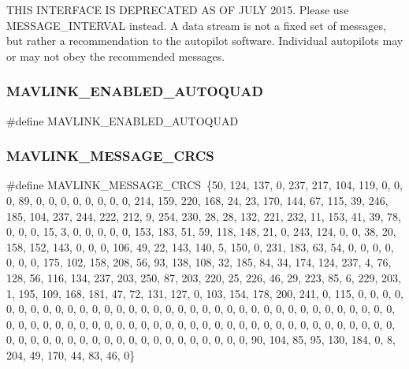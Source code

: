 T\+H\+IS I\+N\+T\+E\+R\+F\+A\+CE IS D\+E\+P\+R\+E\+C\+A\+T\+ED AS OF J\+U\+LY 2015. Please use M\+E\+S\+S\+A\+G\+E\+\_\+\+I\+N\+T\+E\+R\+V\+AL instead. A data stream is not a fixed set of messages, but rather a recommendation to the autopilot software. Individual autopilots may or may not obey the recommended messages. 

\mbox{\label{autoquad_8h_ac0d3655d20affab85c2c0160761e4fac}} 
\subsubsection{M\+A\+V\+L\+I\+N\+K\+\_\+\+E\+N\+A\+B\+L\+E\+D\+\_\+\+A\+U\+T\+O\+Q\+U\+AD}
{\footnotesize\ttfamily \#define M\+A\+V\+L\+I\+N\+K\+\_\+\+E\+N\+A\+B\+L\+E\+D\+\_\+\+A\+U\+T\+O\+Q\+U\+AD}

\mbox{\label{autoquad_8h_a3f709d5835acb54a11202a5fdc7a6bfe}} 
\subsubsection{M\+A\+V\+L\+I\+N\+K\+\_\+\+M\+E\+S\+S\+A\+G\+E\+\_\+\+C\+R\+CS}
{\footnotesize\ttfamily \#define M\+A\+V\+L\+I\+N\+K\+\_\+\+M\+E\+S\+S\+A\+G\+E\+\_\+\+C\+R\+CS~\{50, 124, 137, 0, 237, 217, 104, 119, 0, 0, 0, 89, 0, 0, 0, 0, 0, 0, 0, 0, 214, 159, 220, 168, 24, 23, 170, 144, 67, 115, 39, 246, 185, 104, 237, 244, 222, 212, 9, 254, 230, 28, 28, 132, 221, 232, 11, 153, 41, 39, 78, 0, 0, 0, 15, 3, 0, 0, 0, 0, 0, 153, 183, 51, 59, 118, 148, 21, 0, 243, 124, 0, 0, 38, 20, 158, 152, 143, 0, 0, 0, 106, 49, 22, 143, 140, 5, 150, 0, 231, 183, 63, 54, 0, 0, 0, 0, 0, 0, 0, 175, 102, 158, 208, 56, 93, 138, 108, 32, 185, 84, 34, 174, 124, 237, 4, 76, 128, 56, 116, 134, 237, 203, 250, 87, 203, 220, 25, 226, 46, 29, 223, 85, 6, 229, 203, 1, 195, 109, 168, 181, 47, 72, 131, 127, 0, 103, 154, 178, 200, 241, 0, 115, 0, 0, 0, 0, 0, 0, 0, 0, 0, 0, 0, 0, 0, 0, 0, 0, 0, 0, 0, 0, 0, 0, 0, 0, 0, 0, 0, 0, 0, 0, 0, 0, 0, 0, 0, 0, 0, 0, 0, 0, 0, 0, 0, 0, 0, 0, 0, 0, 0, 0, 0, 0, 0, 0, 0, 0, 0, 0, 0, 0, 0, 0, 0, 0, 0, 0, 0, 0, 0, 0, 0, 0, 0, 0, 0, 0, 0, 0, 0, 0, 0, 0, 0, 0, 0, 0, 0, 0, 90, 104, 85, 95, 130, 184, 0, 8, 204, 49, 170, 44, 83, 46, 0\}}

